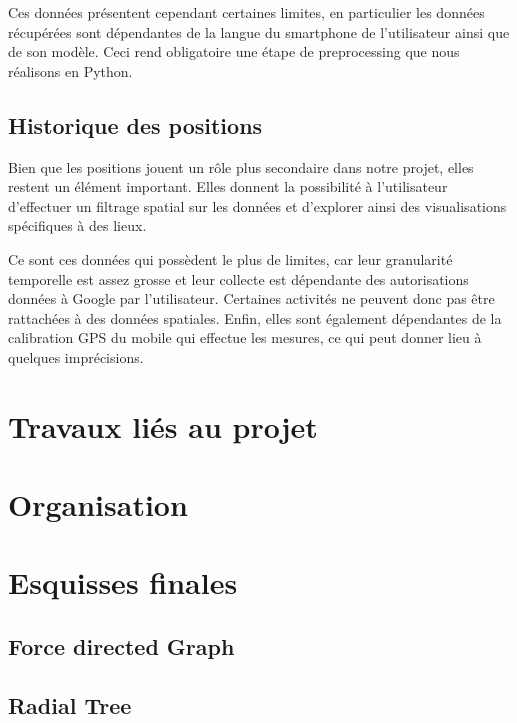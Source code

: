 \documentclass[a4paper, 11pt]{article}
\begin{document}
        Ces données présentent cependant certaines limites, en particulier les données récupérées sont dépendantes de la langue du smartphone de l'utilisateur ainsi que de son modèle. Ceci rend obligatoire une étape de preprocessing que nous réalisons en Python.

        \subsection{Historique des positions}
        Bien que les positions jouent un rôle plus secondaire dans notre projet, elles restent un élément important. Elles donnent la possibilité à l'utilisateur d'effectuer un filtrage spatial sur les données et d'explorer ainsi des visualisations spécifiques à des lieux.

        Ce sont ces données qui possèdent le plus de limites, car leur granularité temporelle est assez grosse et leur collecte est dépendante des autorisations données à Google par l'utilisateur. Certaines activités ne peuvent donc pas être rattachées à des données spatiales. Enfin, elles sont également dépendantes de la calibration GPS du mobile qui effectue les mesures, ce qui peut donner lieu à quelques imprécisions.

    \section{Travaux liés au projet}

    \section{Organisation}

    \section{Esquisses finales}
        \subsection{Force directed Graph}

        \subsection{Radial Tree}
\end{document}

